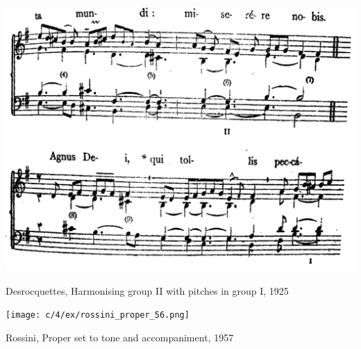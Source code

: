 \begin{example}
  \centering
  \includegraphics[width=.85\linewidth]{c/4/ex/desrocquettes_agnus.png}
  \caption{Desrocquettes, Harmonising group II with pitches in group I, 1925}
  \label{mus:desrocquettes_agnus}
\end{example}

\vspace*{\fill}

\newpage

\vspace*{\fill}


\begin{example}
  \centering
  \texttt{[image: c/4/ex/rossini\_proper\_56.png]}
  \caption{Rossini, Proper set to tone and accompaniment, 1957}
  \label{mus:rossini_proper_56}
\end{example}

\vspace*{\fill}

\newpage


\vspace*{\fill}

